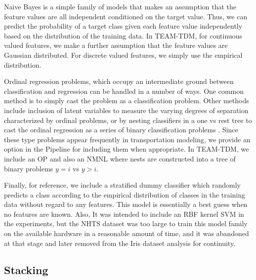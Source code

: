 \documentclass[conference]{IEEEtran}
\begin{document}
Naive Bayes is a simple family of models that makes an assumption that the feature values are all independent conditioned on the target value.
 Thus, we can predict the probability of a target class given each feature value independently based on the distribution of the training data.
 In TEAM-TDM, for continuous valued features, we make a further assumption that the feature values are Gaussian distributed.
 For discrete valued features, we simply use the empirical distribution.

Ordinal regression problems, which occupy an intermediate ground between classification and regression can be handled in a number of ways.
 One common method is to simply cast the problem as a classification problem.
 Other methods include inclusion of latent variables to measure the varying degrees of separation characterized by ordinal problems, or by nesting classifiers in a one vs rest tree to cast the ordinal regression as a series of binary classification problems \cite{frank2001simple}.
 Since these type problems appear frequently in transportation modeling, we provide an option in the Pipeline for including them when appropriate.
 In TEAM-TDM, we include an OP and also an NMNL where nests are constructed into a tree of binary problems $y = i$ vs $y > i$.

Finally, for reference, we include a stratified dummy classifier which randomly predicts a class according to the empirical distribution of classes in the training data without regard to any features.
 This model is essentially a best guess when no features are known.
 Also, It was intended to include an RBF kernel SVM in the experiments, but the NHTS dataset was too large to train this model family on the available hardware in a reasonable amount of time, and it was abandoned at that stage and later removed from the Iris dataset analysis for continuity.

\subsection{Stacking} \label{subsection:stacking}
\end{document}
